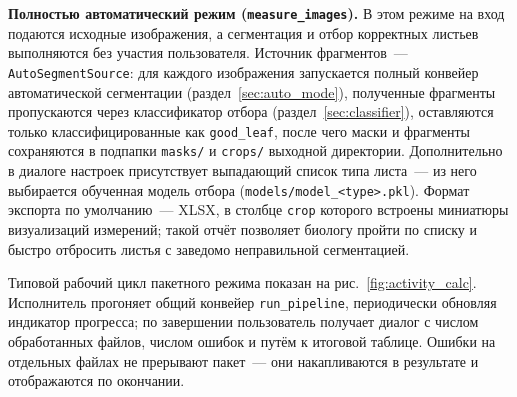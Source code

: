 \textbf{Полностью автоматический режим (\texttt{measure\_images}).} В этом режиме
на вход подаются исходные изображения, а сегментация и отбор корректных листьев
выполняются без участия пользователя. Источник фрагментов~--- \texttt{AutoSegmentSource}:
для каждого изображения запускается полный конвейер автоматической сегментации
(раздел~\ref{sec:auto_mode}), полученные фрагменты пропускаются через классификатор
отбора (раздел~\ref{sec:classifier}), оставляются только классифицированные как
\texttt{good\_leaf}, после чего маски и фрагменты сохраняются в подпапки
\texttt{masks/} и \texttt{crops/} выходной директории. Дополнительно в диалоге настроек присутствует выпадающий список типа
листа~--- из него выбирается обученная модель отбора (\texttt{models/model\_<type>.pkl}).
Формат экспорта по умолчанию~--- XLSX, в столбце \texttt{crop} которого встроены
миниатюры визуализаций измерений; такой отчёт позволяет биологу пройти по списку
и быстро отбросить листья с заведомо неправильной сегментацией.

Типовой рабочий цикл пакетного режима показан на рис.~\ref{fig:activity_calc}.
Исполнитель прогоняет общий конвейер \texttt{run\_pipeline}, периодически обновляя
индикатор прогресса; по завершении пользователь получает диалог с числом обработанных
файлов, числом ошибок и путём к итоговой таблице. Ошибки на отдельных файлах
не прерывают пакет~--- они накапливаются в результате и отображаются по окончании.

